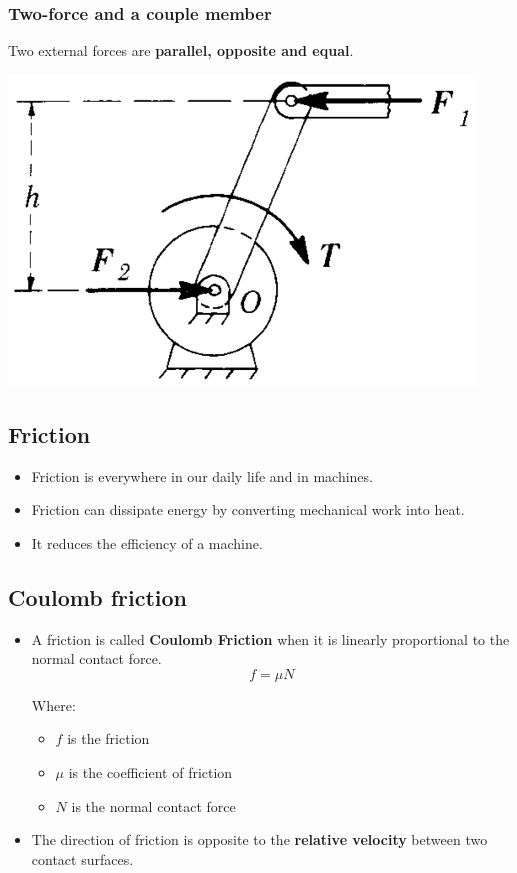 \documentclass[11pt]{article}
\begin{document}
\subsubsection{Two-force and a couple member}
\label{sec:org4e59eb3}
Two external forces are \textbf{parallel, opposite and equal}.
\begin{center}
\includegraphics[width=.9\linewidth]{./images/two-force-and-a-couple-member-diagram.png}
\end{center}
\subsection{Friction}
\label{sec:orge88f68a}
\begin{itemize}
\item Friction is everywhere in our daily life and in machines.
\item Friction can dissipate energy by converting mechanical work into heat.
\item It reduces the efficiency of a machine.
\end{itemize}

 \newpage
\subsection{Coulomb friction}
\label{sec:orge378e2a}
\begin{itemize}
\item A friction is called \textbf{Coulomb Friction} when it is linearly proportional to the normal contact force.
\[f = \mu N\]

Where:
\begin{itemize}
\item \(f\) is the friction
\item \(\mu\) is the coefficient of friction
\item \(N\) is the normal contact force
\end{itemize}

\item The direction of friction is opposite to the \textbf{relative velocity} between two contact surfaces.
\end{itemize}
\end{document}
